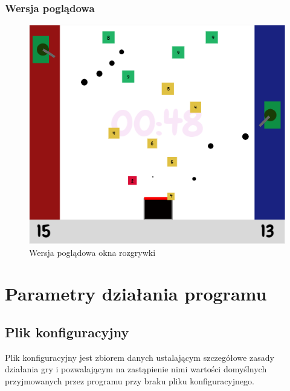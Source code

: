 \documentclass[11pt,a4paper]{report}
\begin{document}
\subsubsection{Wersja poglądowa}
\begin{figure}[!ht]
\centerline{\includegraphics{img/game2.png}}
\caption{Wersja poglądowa okna rozgrywki}
\end{figure}
\newpage
\section{Parametry działania programu}
\subsection {Plik konfiguracyjny}
Plik konfiguracyjny jest zbiorem danych ustalającym szczegółowe zasady działania gry i pozwalającym na zastąpienie nimi wartości domyślnych przyjmowanych przez programu przy braku pliku konfiguracyjnego.
\end{document}
